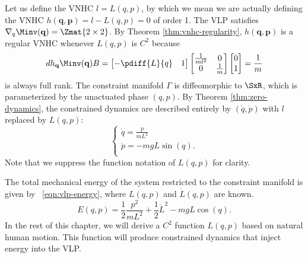 Let us define the VNHC \(l = L(q,p)\), by which we mean we are
actually defining the VNHC \(h(\mathbf{q},\mathbf{p}) = l - L(q,p) = 0\) of
order 1.
The VLP satisfies
\(\nabla_q \Minv(\mathbf{q}) = \Zmat{2 \times 2}\).
By Theorem \ref{thm:vnhc-regularity},
\(h(\mathbf{q},\mathbf{p})\) is a regular VNHC whenever 
\(L(q,p)\) is \(C^2\) because
\[
   dh_{\mathbf{q}} \Minv(\mathbf{q})B = 
   \begin{bmatrix}
      -\pdiff{L}{q} & 1
   \end{bmatrix}
   \begin{bmatrix}
      \frac{1}{ml^2}  & 0 \\
      0 & \frac{1}{m}
   \end{bmatrix} 
   \begin{bmatrix}
      0 \\ 
      1
   \end{bmatrix}
   = \frac{1}{m}
\]
is always full rank.
The constraint manifold \(\Gamma\) is diffeomorphic to 
\(\SxR\), which is parameterized by the unactuated
phase \((q,p)\).
By Theorem \ref{thm:zero-dynamics}, the constrained dynamics
are described entirely by \((\dot{q},\dot{p})\) with \(l\)
replaced by \(L(q,p)\):
\begin{equation}\label{eqn:vlp-hamiltonian}
   \begin{cases}
      \dot{q} = \frac{p}{m L^2} \\
      \dot{p} = -mgL\sin(q)
      . \\ 
   \end{cases}
\end{equation}
Note that we suppress the function notation of \(L(q,p)\) for clarity.

The total mechanical energy of the system restricted to the constraint manifold
is given by ~\eqref{eqn:vlp-energy}, where \(L(q,p)\) and \(\dot{L}(q,p)\) are
known.
\begin{equation}\label{eqn:vlp-energy}
   E(q,p) = \frac{1}{2} \frac{p^2}{mL^2} + \frac{1}{2}\dot{L}^2 - mgL\cos(q)
   .
\end{equation}
In the rest of this chapter, we will derive a \(C^2\) function \(L(q,p)\) based
on natural human motion.
This function will produce constrained dynamics that inject energy into the VLP.


